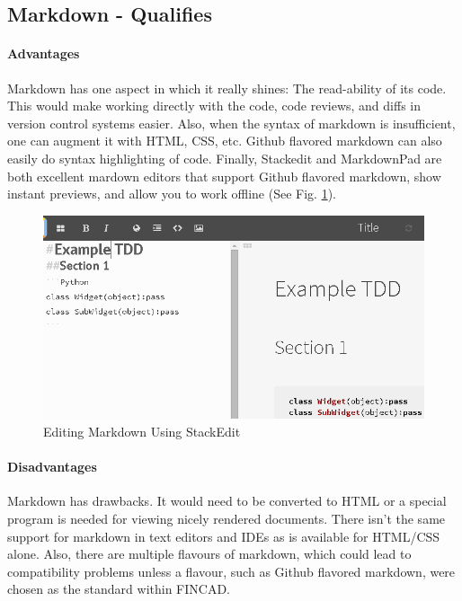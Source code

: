 \documentclass[12pt]{Report}
\begin{document}
\subsection{Markdown - Qualifies}
	\paragraph{Advantages}
	Markdown has one aspect in which it really shines: The read-ability of its code.  
	This would make working directly with the code, code reviews, and diffs in version control systems easier.  
	Also, when the syntax of markdown is insufficient, one can augment it with HTML, CSS, etc.  
	Github flavored markdown can also easily do syntax highlighting of code.  
	Finally, Stackedit and MarkdownPad are both excellent mardown editors that support Github flavored markdown, 
	show instant previews, and allow you to work offline (See Fig. \ref{StackEdit}).
	
	\begin{figure}[h]
		\centering
		\includegraphics[scale=.5]{StackEdit.png}
		\caption{Editing Markdown Using StackEdit}
		\label{StackEdit}
	\end{figure}
	
	\paragraph{Disadvantages}	
	Markdown has drawbacks. It would need to be converted to HTML or a special program is needed for viewing nicely rendered documents.  
	There isn't the same support for markdown in text editors and IDEs as is available for HTML/CSS alone.  
	Also, there are multiple flavours of markdown, which could lead to compatibility problems unless a flavour, 
	such as Github flavored markdown, were chosen as the standard within FINCAD.
\end{document}
